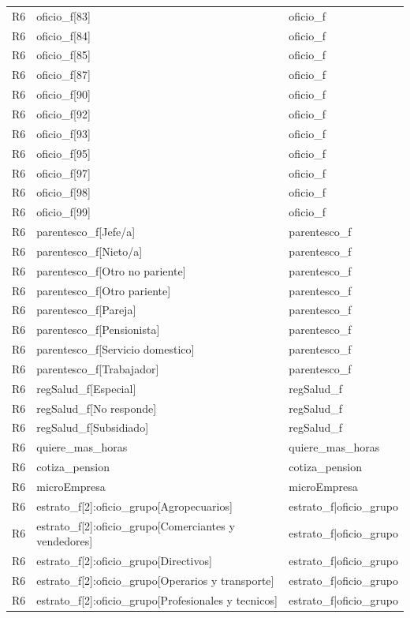 \begin{longtable}{lll}
R6 & oficio\_f[83] & oficio\_f \\
R6 & oficio\_f[84] & oficio\_f \\
R6 & oficio\_f[85] & oficio\_f \\
R6 & oficio\_f[87] & oficio\_f \\
R6 & oficio\_f[90] & oficio\_f \\
R6 & oficio\_f[92] & oficio\_f \\
R6 & oficio\_f[93] & oficio\_f \\
R6 & oficio\_f[95] & oficio\_f \\
R6 & oficio\_f[97] & oficio\_f \\
R6 & oficio\_f[98] & oficio\_f \\
R6 & oficio\_f[99] & oficio\_f \\
R6 & parentesco\_f[Jefe/a] & parentesco\_f \\
R6 & parentesco\_f[Nieto/a] & parentesco\_f \\
R6 & parentesco\_f[Otro no pariente] & parentesco\_f \\
R6 & parentesco\_f[Otro pariente] & parentesco\_f \\
R6 & parentesco\_f[Pareja] & parentesco\_f \\
R6 & parentesco\_f[Pensionista] & parentesco\_f \\
R6 & parentesco\_f[Servicio domestico] & parentesco\_f \\
R6 & parentesco\_f[Trabajador] & parentesco\_f \\
R6 & regSalud\_f[Especial] & regSalud\_f \\
R6 & regSalud\_f[No responde] & regSalud\_f \\
R6 & regSalud\_f[Subsidiado] & regSalud\_f \\
R6 & quiere\_mas\_horas & quiere\_mas\_horas \\
R6 & cotiza\_pension & cotiza\_pension \\
R6 & microEmpresa & microEmpresa \\
R6 & estrato\_f[2]:oficio\_grupo[Agropecuarios] & estrato\_f|oficio\_grupo \\
R6 & estrato\_f[2]:oficio\_grupo[Comerciantes y vendedores] & estrato\_f|oficio\_grupo \\
R6 & estrato\_f[2]:oficio\_grupo[Directivos] & estrato\_f|oficio\_grupo \\
R6 & estrato\_f[2]:oficio\_grupo[Operarios y transporte] & estrato\_f|oficio\_grupo \\
R6 & estrato\_f[2]:oficio\_grupo[Profesionales y tecnicos] & estrato\_f|oficio\_grupo \\

\end{longtable}
